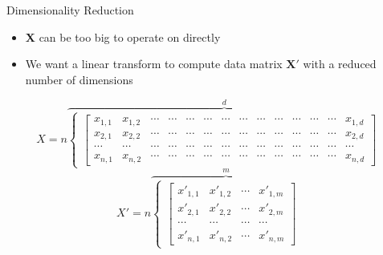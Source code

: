 \documentclass[aspectratio=169]{beamer}
\begin{document}
\begin{frame}{Dimensionality Reduction}

\begin{itemize}
	\item \textbf{X} can be too big to operate on directly
	\item We want a linear transform to compute data matrix $\textbf{X}'$ with a reduced number of dimensions
\end{itemize}
\[
X= n \overbrace{\begin{cases}
               \left[\begin{array}{cccccccccccccc}
	x_{1,1} & x_{1,2} & \cdots& \cdots& \cdots& \cdots& \cdots& \cdots& \cdots& \cdots& \cdots& \cdots& \cdots & x_{1,d}	\\
	x_{2,1} & x_{2,2} & \cdots & \cdots& \cdots& \cdots& \cdots& \cdots& \cdots& \cdots& \cdots& \cdots& \cdots& x_{2,d}	\\
	\cdots & \cdots & \cdots & \cdots& \cdots& \cdots& \cdots& \cdots& \cdots& \cdots& \cdots& \cdots& \cdots&\cdots	\\
	x_{n,1} & x_{n,2} & \cdots& \cdots& \cdots& \cdots& \cdots& \cdots& \cdots& \cdots& \cdots& \cdots& \cdots & x_{n,d}	
\end{array}\right]
            \end{cases}}^d
\]
\[
X'= n \overbrace{\begin{cases}
               \left[\begin{array}{cccc}
	x'_{1,1} & x'_{1,2} & \cdots & x'_{1,m}	\\
	x'_{2,1} & x'_{2,2} & \cdots & x'_{2,m}	\\
	\cdots & \cdots & \cdots &\cdots	\\
	x'_{n,1} & x'_{n,2} & \cdots & x'_{n,m}	
\end{array}\right]
            \end{cases}}^m
\]

\end{frame}
\end{document}
